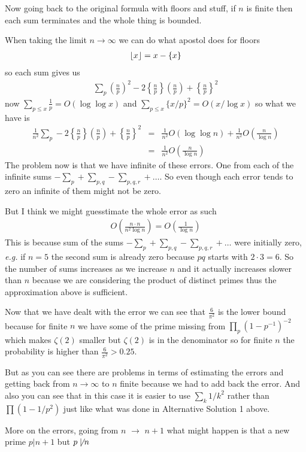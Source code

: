 \documentclass[aps,preprint,preprintnumbers,nofootinbib,showpacs,prd]{revtex4-1}
\newcommand{\eg}{{\it e.g.} }
\newcommand{\nbea}{\begin{eqnarray*}}
\newcommand{\neea}{\end{eqnarray*}}
\DeclarePairedDelimiter{\floor}{\lfloor}{\rfloor}
\begin{document}
\begin{enumerate}
Now going back to the original formula with floors and stuff, if $n$ is finite then each sum terminates and the whole thing is bounded.

When taking the limit $n \to \infty$ we can do what apostol does for floors
%
\nbea
\floor{x} = x - \{ x \}
\neea
%
so each sum gives us
%
\nbea
\sum_p \left ( \frac{n}{p} \right )^2 - 2 \left \{ \frac{n}{p} \right \} \left ( \frac{n}{p} \right ) + \left \{ \frac{n}{p} \right \}^2
\neea
%
now $\sum_{p \le x} \frac{1}{p} = O(\log\log x)$ and $\sum_{p \le x} \{x/p\}^2 = O(x/\log x)$ so what we have is 
%
\nbea
\frac{1}{n^2} \sum_p - 2 \left \{ \frac{n}{p} \right \} \left ( \frac{n}{p} \right ) + \left \{ \frac{n}{p} \right \}^2 & = &\frac{1}{n^2} O(\log\log n) + \frac{1}{n^2}O\left(\frac{n}{\log n}\right) \\
& = & \frac{1}{n^2} O\left ( \frac{n}{\log n} \right )
\neea
%
The problem now is that we have infinite of these errors. One from each of the infinite sums $-\sum_p + \sum_{p,q} - \sum_{p,q,r} + \dots$. So even though each error tends to zero an infinite of them might not be zero.

But I think we might guesstimate the whole error as such 
%
\nbea
O\left ( \frac{n\cdot n}{n^2 \log n} \right ) = O \left ( \frac{1}{\log n} \right )
\neea
%
This is because sum of the sums $-\sum_p + \sum_{p,q} - \sum_{p,q,r} + \dots$ were initially zero, \eg if $n = 5$ the second sum is already zero because $pq$ starts with $2\cdot3 = 6$. So the number of sums increases as we increase $n$ and it actually increases slower than $n$ because we are considering the product of distinct primes thus the approximation above is sufficient.

Now that we have dealt with the error we can see that $\frac{6}{\pi^2}$ is the lower bound because for finite $n$ we have some of the prime missing from $\prod_p (1 - p^{-1})^{-2}$ which makes $\zeta(2)$ smaller but $\zeta(2)$ is in the denominator so for finite $n$ the probability is higher than $\frac{6}{\pi^2} > 0.25$.

But as you can see there are problems in terms of estimating the errors and getting back from $n \to \infty$ to $n$ finite because we had to add back the error. And also you can see that in this case it is easier to use $\sum_k 1/k^2$ rather than $\prod (1 - 1/p^2)$ just like what was done in Alternative Solution 1 above.

%

\end{enumerate}
%







































More on the errors, going from $n$ $\to$ $n+1$ what might happen is that a new prime $p|n+1$ but $p\not\mid n$
\end{document}

